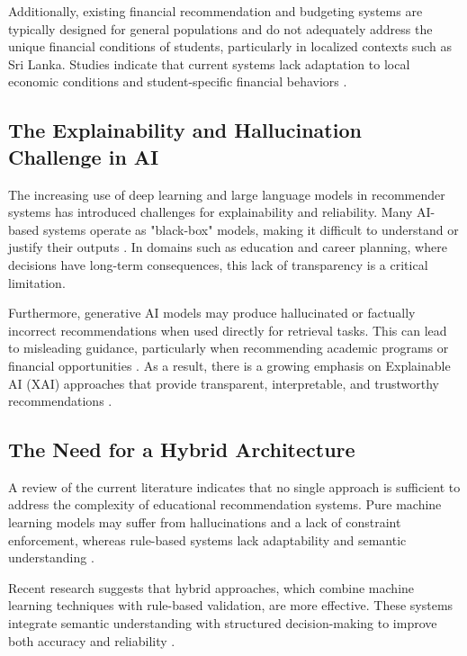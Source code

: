 \documentclass[conference]{IEEEtran}
\begin{document}
Additionally, existing financial recommendation and budgeting systems are typically designed for general populations and do not adequately address the unique financial conditions of students, particularly in localized contexts such as Sri Lanka. Studies indicate that current systems lack adaptation to local economic conditions and student-specific financial behaviors \cite{sljssh2021online}.

\subsection{The Explainability and Hallucination Challenge in AI}
The increasing use of deep learning and large language models in recommender systems has introduced challenges for explainability and reliability. Many AI-based systems operate as "black-box" models, making it difficult to understand or justify their outputs \cite{springer2024genai_sl, cmb2025ai_nursing}. In domains such as education and career planning, where decisions have long-term consequences, this lack of transparency is a critical limitation.

Furthermore, generative AI models may produce hallucinated or factually incorrect recommendations when used directly for retrieval tasks. This can lead to misleading guidance, particularly when recommending academic programs or financial opportunities \cite{springer2024genai_sl}. As a result, there is a growing emphasis on Explainable AI (XAI) approaches that provide transparent, interpretable, and trustworthy recommendations \cite{wang2023finding, vozniuk2025teacher}.

\subsection{The Need for a Hybrid Architecture}
A review of the current literature indicates that no single approach is sufficient to address the complexity of educational recommendation systems. Pure machine learning models may suffer from hallucinations and a lack of constraint enforcement, whereas rule-based systems lack adaptability and semantic understanding \cite{manouselis2021recommendation, silva2026systematic}.

Recent research suggests that hybrid approaches, which combine machine learning techniques with rule-based validation, are more effective. These systems integrate semantic understanding with structured decision-making to improve both accuracy and reliability \cite{chen2025integrating, alghamdi2025analysis}. 
\end{document}

